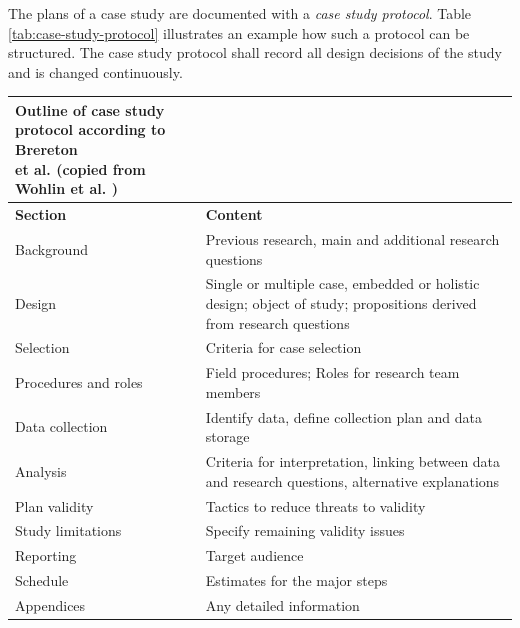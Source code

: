 \documentclass[runningheads]{llncs}
\begin{document}
The plans of a case study are documented with a \textit{case study protocol}. Table \ref{tab:case-study-protocol} illustrates an example how such a protocol can be structured. The case study protocol shall record all design decisions of the study and is changed continuously.

\begin{tabularx}{\textwidth}{ p{3.0cm} X }
\caption{Outline of case study protocol according to Brereton\\ et al. \cite{Brereton:2008:UPT:2227115.2227120} (copied from Wohlin et al. \cite{Wohlin:2012:ESE:2349018})}\label{tab:case-study-protocol} \\
	\hline
	\RaggedRight \textbf{Section} & \RaggedRight \textbf{Content} \\
	\endhead
	\hline
	\RaggedRight Background & \RaggedRight Previous research, main and additional research questions \\
	\hline
	\RaggedRight Design & \RaggedRight Single or multiple case, embedded or holistic design; object of study; propositions derived from research questions \\
	\hline
	\RaggedRight Selection & \RaggedRight Criteria for case selection \\
	\hline
	\RaggedRight Procedures and roles & \RaggedRight Field procedures; Roles for research team members \\
	\hline
	\RaggedRight Data collection & \RaggedRight Identify data, define collection plan and data storage \\
	\hline
	\RaggedRight Analysis & \RaggedRight Criteria for interpretation, linking between data and research questions, alternative explanations \\
	\hline
	\RaggedRight Plan validity & \RaggedRight Tactics to reduce threats to validity \\
	\hline
	\RaggedRight Study limitations & \RaggedRight Specify remaining validity issues \\
	\hline
	\RaggedRight Reporting & \RaggedRight Target audience \\
	\hline
	\RaggedRight Schedule & \RaggedRight Estimates for the major steps \\
	\hline
	\RaggedRight Appendices & \RaggedRight Any detailed information \\
	\hline
\end{tabularx}
\end{document}
